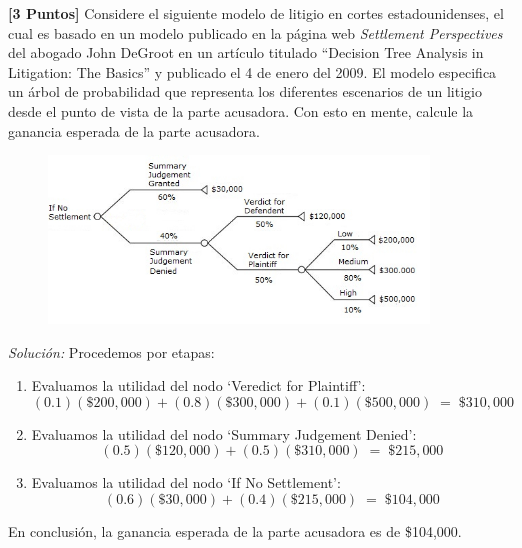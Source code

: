 \documentclass[ a4paper, twoside, 11pt]{article}
\begin{document}
\begin{problem}
\textbf{[3 Puntos]} Considere el siguiente modelo de litigio en cortes estadounidenses, el cual es basado en un modelo publicado en la p\'agina web \emph{Settlement Perspectives} del abogado John DeGroot en un art\'iculo titulado ``Decision Tree Analysis in Litigation: The Basics'' y publicado el 4 de enero del 2009. El modelo especifica un \'arbol de probabilidad que representa los diferentes escenarios de un litigio desde el punto de vista de la parte acusadora. Con esto en mente, calcule la ganancia esperada de la parte acusadora. 

\begin{figure}[H]
\centering
\includegraphics[width=0.9\textwidth]{problema_arbol-recompensas.jpg}
\end{figure}

\emph{Soluci\'on:} Procedemos por etapas: 
\begin{enumerate}
\item Evaluamos la utilidad del nodo `Veredict for Plaintiff': 
\[
(0.1)(\$200,000) + (0.8)(\$300,000) + (0.1)(\$500,000) \; = \; \$310,000
\]
\item Evaluamos la utilidad del nodo `Summary Judgement Denied': 
\[
(0.5)(\$120,000) + (0.5)(\$310,000) \; = \; \$215,000
\]
\item Evaluamos la utilidad del nodo `If No Settlement': 
\[
(0.6)(\$30,000) + (0.4)(\$215,000) \; = \; \$104,000
\]
\end{enumerate}
En conclusi\'on, la ganancia esperada de la parte acusadora es de \$104,000. 

\end{problem}
\vspace{\baselineskip}
\end{document}
